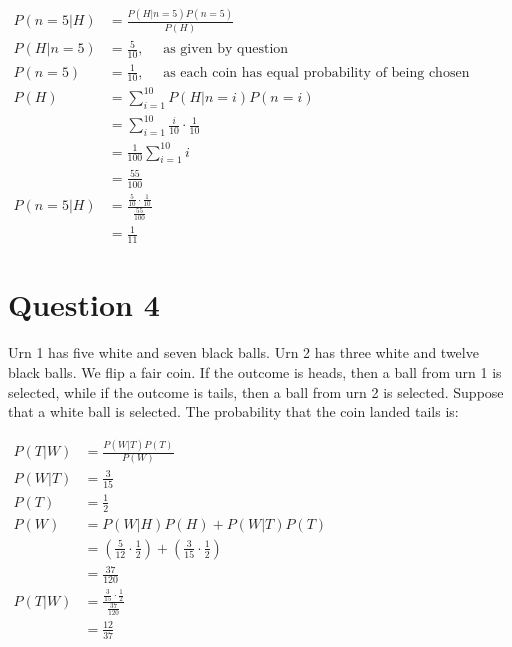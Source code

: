 \documentclass{article}
\begin{document}
$\begin{aligned}
              P(n=5|H) & = \frac{P(H|n=5)P(n=5)}{P(H)}                                                  \\
              P(H|n=5) & = \frac{5}{10},\quad\text{ as given by question}                               \\
              P(n=5)   & = \frac{1}{10},\quad\text{ as each coin has equal probability of being chosen} \\
              P(H)     & = \sum_{i=1}^{10} P(H|n=i)P(n=i)                                               \\
                       & = \sum_{i=1}^{10} \frac{i}{10} \cdot \frac{1}{10}                              \\
                       & = \frac{1}{100} \sum_{i=1}^{10} i                                              \\
                       & = \frac{55}{100}                                                               \\
              P(n=5|H) & = \frac{\frac{5}{10} \cdot \frac{1}{10}}{\frac{55}{100}}                       \\
                       & = \frac{1}{11}
       \end{aligned}
$

\section*{Question 4}

Urn 1 has five white and seven black balls. Urn 2 has three white and twelve black balls. We flip a fair coin. If the outcome is heads, then a ball from urn 1 is selected, while if the outcome is tails, then a ball from urn 2 is selected. Suppose that a white ball is selected. The probability that the coin landed tails is:

$\begin{aligned}
              P(T|W) & = \frac{P(W|T)P(T)}{P(W)}                                             \\
              P(W|T) & = \frac{3}{15}                                                        \\
              P(T)   & = \frac{1}{2}                                                         \\
              P(W)   & = P(W|H)P(H) + P(W|T)P(T)                                             \\
                     & = (\frac{5}{12} \cdot \frac{1}{2}) + (\frac{3}{15} \cdot \frac{1}{2}) \\
                     & = \frac{37}{120}                                                      \\
              P(T|W) & = \frac{\frac{3}{15} \cdot \frac{1}{2}}{\frac{37}{120}}               \\
                     & = \frac{12}{37}
       \end{aligned}$
\end{document}
